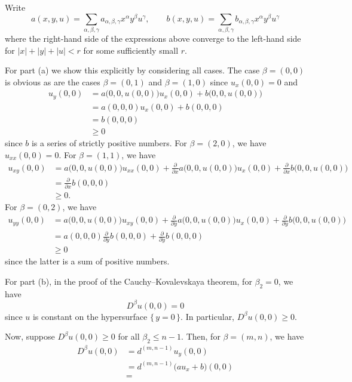 \begin{solution}
  Write
  \[
    a(x,y,u)=\sum_{\alpha,\beta,\gamma} a_{\alpha,\beta,\gamma}x^\alpha
    y^\beta u^\gamma,%
    \qquad%
    b(x,y,u)=\sum_{\alpha,\beta,\gamma} b_{\alpha,\beta,\gamma}x^\alpha
    y^\beta u^\gamma
  \]
  where the right-hand side of the expressions above converge to the
  left-hand side for \(|x|+|y|+|u|<r\) for some sufficiently small \(r\).

  For part (a) we show this explicitly by considering all cases. The case
  \(\beta=(0,0)\) is obvious as are the cases \(\beta=(0,1)\) and
  \(\beta=(1,0)\) since \(u_x(0,0)=0\) and
  \begin{align*}
    u_y(0,0)
    &=a\bigl(0,0,u(0,0)\bigr)u_x(0,0)+b\bigl( 0,0,u(0,0) \bigr)\\
    &=a(0,0,0)u_x(0,0)+b(0,0,0)\\
    &=b(0,0,0)\\
    &\geq 0
  \end{align*}
  since \(b\) is a series of strictly positive numbers. For
  \(\beta=(2,0)\), we have \(u_{xx}(0,0)=0\). For \(\beta=(1,1)\), we have
  \begin{align*}
    u_{xy}(0,0)&=a\bigl(0,0,u(0,0)\bigr)u_{xx}(0,0)+\frac{\partial}{\partial
                 x}a\bigl( 0,0,u(0,0) \bigr)u_x(0,0)
                 +\frac{\partial}{\partial x} b\bigl(0,0,u(0,0)\bigr)\\
               &=\frac{\partial}{\partial x} b(0,0,0)\\
               &\geq 0.
  \end{align*}
  For \(\beta=(0,2)\), we have
  \begin{align*}
    u_{yy}(0,0)&=a\bigl(0,0,u(0,0)\bigr)u_{xy}(0,0)+\frac{\partial}{\partial
                 y}a\bigl( 0,0,u(0,0) \bigr)u_x(0,0)
                 +\frac{\partial}{\partial y} b\bigl(0,0,u(0,0)\bigr)\\
               &=a(0,0,0)\frac{\partial}{\partial
                 y}b(0,0,0)+\frac{\partial}{\partial y}b(0,0,0)\\
               &\geq 0
  \end{align*}
  since the latter is a sum of positive numbers.

  For part (b), in the proof of the Cauchy--Kovalevskaya theorem, for
  \(\beta_2=0\), we have
  \[
    D^\beta u(0,0)=0
  \]
  since \(u\) is constant on the hypersurface \(\{\,y=0\,\}\). In
  particular, \(D^\beta u(0,0)\geq 0\).

  Now, suppose \(D^\beta u(0,0)\geq 0\) for all \(\beta_2\leq n-1\). Then,
  for \(\beta=(m,n)\), we have
  \begin{align*}
    D^\beta u(0,0)
    &=d^{(m,n-1)} u_y(0,0)\\
    &=d^{(m,n-1)}\bigl(au_x+b\bigr)(0,0)\\
    &=
  \end{align*}


\end{solution}
